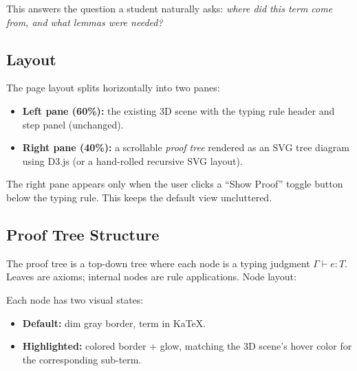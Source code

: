 \documentclass[11pt,a4paper]{article}
\begin{document}
This answers the question a student naturally asks: \emph{where did this term
come from, and what lemmas were needed?}

\subsection{Layout}

The page layout splits horizontally into two panes:
\begin{itemize}
  \item \textbf{Left pane (60\%):} the existing 3D scene with the typing rule
    header and step panel (unchanged).
  \item \textbf{Right pane (40\%):} a scrollable \emph{proof tree} rendered as
    an SVG tree diagram using D3.js (or a hand-rolled recursive SVG layout).
\end{itemize}

\noindent The right pane appears only when the user clicks a ``Show Proof''
toggle button below the typing rule. This keeps the default view uncluttered.

\subsection{Proof Tree Structure}

The proof tree is a top-down tree where each node is a typing judgment
$\Gamma \vdash e : T$. Leaves are axioms; internal nodes are rule applications.
Node layout:

\begin{center}
\end{center}

\noindent Each node has two visual states:
\begin{itemize}
  \item \textbf{Default:} dim gray border, term in KaTeX.
  \item \textbf{Highlighted:} colored border + glow, matching the 3D scene's
    hover color for the corresponding sub-term.
\end{itemize}
\end{document}
